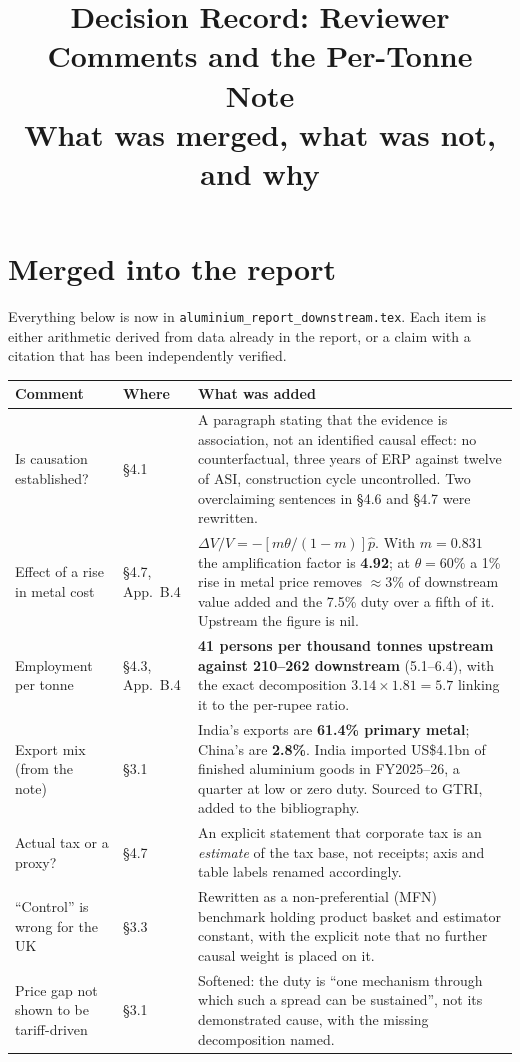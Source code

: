 \documentclass[11pt, a4paper]{article}
\title{\textbf{Decision Record: Reviewer Comments and the Per-Tonne Note}\\
\large What was merged, what was not, and why}
\author{}
\date{}
\begin{document}
\maketitle
\vspace{-1.0cm}

\section{Merged into the report}

Everything below is now in \texttt{aluminium\_report\_downstream.tex}. Each item is
either arithmetic derived from data already in the report, or a claim with a
citation that has been independently verified.

\begin{table}[H]
\centering
\small
\begin{tabular}{p{4.3cm}p{2.2cm}p{8.4cm}}
\toprule
\textbf{Comment} & \textbf{Where} & \textbf{What was added} \\
\midrule
Is causation established? & §4.1 & A paragraph stating that the evidence is
association, not an identified causal effect: no counterfactual, three years of ERP
against twelve of ASI, construction cycle uncontrolled. Two overclaiming sentences
in §4.6 and §4.7 were rewritten. \\
\addlinespace
Effect of a rise in metal cost & §4.7, App.~B.4 &
$\Delta V/V = -[m\theta/(1-m)]\hat p$. With $m = 0.831$ the amplification factor is
\textbf{4.92}; at $\theta = 60\%$ a 1\% rise in metal price removes $\approx$3\% of
downstream value added and the 7.5\% duty over a fifth of it. Upstream the figure
is nil. \\
\addlinespace
Employment per tonne & §4.3, App.~B.4 &
\textbf{41 persons per thousand tonnes upstream against 210--262 downstream}
(5.1--6.4), with the exact decomposition
$3.14 \times 1.81 = 5.7$ linking it to the per-rupee ratio. \\
\addlinespace
Export mix (from the note) & §3.1 &
India's exports are \textbf{61.4\% primary metal}; China's are \textbf{2.8\%}.
India imported US\$4.1bn of finished aluminium goods in FY2025--26, a quarter at
low or zero duty. Sourced to GTRI, added to the bibliography. \\
\addlinespace
Actual tax or a proxy? & §4.7 &
An explicit statement that corporate tax is an \emph{estimate} of the tax base, not
receipts; axis and table labels renamed accordingly. \\
\addlinespace
``Control'' is wrong for the UK & §3.3 &
Rewritten as a non-preferential (MFN) benchmark holding product basket and estimator
constant, with the explicit note that no further causal weight is placed on it. \\
\addlinespace
Price gap not shown to be tariff-driven & §3.1 &
Softened: the duty is ``one mechanism through which such a spread can be sustained'',
not its demonstrated cause, with the missing decomposition named. \\
\bottomrule
\end{tabular}
\end{table}
\end{document}
